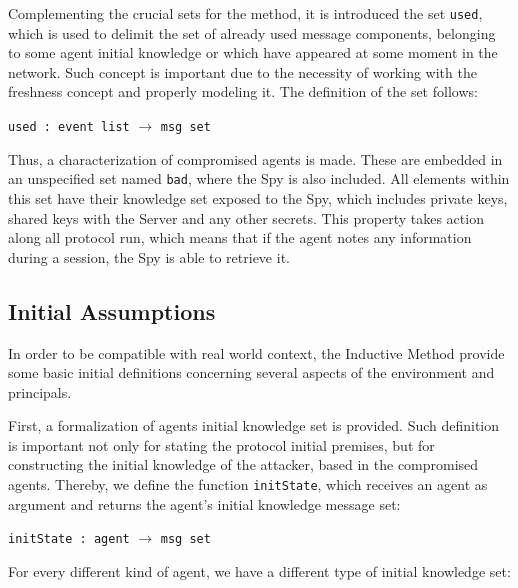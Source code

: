 Complementing the crucial sets for the method, it is introduced the set \texttt{used}, which is used to delimit the set of already used message components, belonging to some agent initial knowledge or which have appeared at some moment in the network. Such concept is important due to the necessity of working with the freshness concept and properly modeling it. The definition of the set follows:

\begin{center}
  \texttt{used : event list} $\longrightarrow$ \texttt{msg set}
\end{center}


Thus, a characterization of compromised agents is made. These are embedded in an unspecified set named \texttt{bad}, where the Spy is also included. All elements within this set have their knowledge set exposed to the Spy, which includes private keys, shared keys with the Server and any other secrets. This property takes action along all protocol run, which means that if the agent notes any information during a session, the Spy is able to retrieve it.


\subsection{Initial Assumptions}
\label{sec:initial-assumptions}
In order to be compatible with real world context, the Inductive Method provide some basic initial definitions concerning several aspects of the environment and principals.

First, a formalization of agents initial knowledge set is provided. Such definition is important not only for stating the protocol initial premises, but for constructing the initial knowledge of the attacker, based in the compromised agents. Thereby, we define the function \texttt{initState}, which receives an agent as argument and returns the agent's initial knowledge message set:

\begin{center}
  \texttt{initState : agent} $\longrightarrow$ \texttt{msg set}
\end{center}

For every different kind of agent, we have a different type of initial knowledge set:

